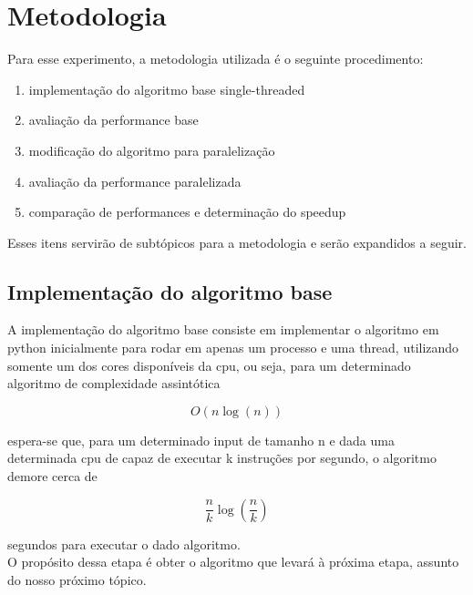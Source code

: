 \documentclass{article}
\begin{document}
\section{Metodologia}
Para esse experimento, a metodologia utilizada é o seguinte procedimento:
\begin{enumerate}
    \item implementação do algoritmo base single-threaded
    \item avaliação da performance base
    \item modificação do algoritmo para paralelização
    \item avaliação da performance paralelizada
    \item comparação de performances e determinação do speedup
\end{enumerate}
Esses itens servirão de subtópicos para a metodologia e serão expandidos a seguir.

\subsection{Implementação do algoritmo base}
    A implementação do algoritmo base consiste em implementar o algoritmo em python inicialmente para rodar em apenas um processo e uma thread, utilizando somente um dos cores disponíveis da cpu, ou seja, para um determinado algoritmo de complexidade assintótica 
        
        \begin{equation}\label{perfbase}
            O(n \log(n))    
        \end{equation}
    
    espera-se que, para um determinado input de tamanho n e dada uma determinada cpu de capaz de executar k instruções por segundo, o algoritmo demore cerca de
        
        \begin{equation}\label{perfseg}
            \frac{n}{k} \log(\frac{n}{k})
        \end{equation}
        
    segundos para executar o dado algoritmo.\\ 
    O propósito dessa etapa é obter o algoritmo que levará à próxima etapa, assunto do nosso próximo tópico.\\
\end{document}
